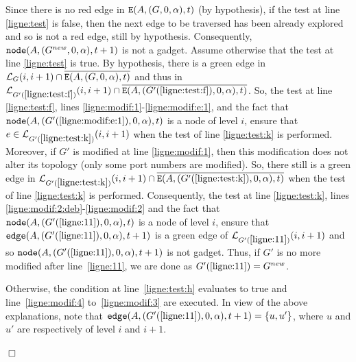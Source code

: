 \documentclass[11pt]{article}
\newcommand{\qed}{\hfill $\Box$ \bigbreak}
\newenvironment{proof}{\noindent {\bf Proof.}}{\qed}
\begin{document}
{\begin{proof}
Since there is no red edge in ${\tt E}(A,(G,0,\alpha),t)$ (by hypothesis), if the test at line
  \ref{ligne:test} is false, then the next edge to be traversed has
  been already explored and so is not a red edge, still by
  hypothesis. Consequently, ${\tt node}(A,(G^{new},0,\alpha),t+1)$ is not a
  gadget.  Assume otherwise that the test at line \ref{ligne:test} is
  true. By hypothesis, there is a green edge in
  $\mathcal{L}_{G}(i,i+1)\cap\overline{{\tt
      E}(A,(G,0,\alpha),t)}$ and thus in $\mathcal{L}_{G'(\ref{ligne:test:f})}(i,i+1)\cap\overline{{\tt
      E}(A,(G'(\ref{ligne:test:f}),0,\alpha),t)}$. So, the test at line \ref{ligne:test:f}, lines \ref{ligne:modif:1}-\ref{ligne:modif:e:1}, and the fact that ${\tt node}(A,(G'(\ref{ligne:modif:e:1}),0,\alpha),t)$ is a node of level $i$, ensure that $e
  \in \mathcal{L}_{G'(\ref{ligne:test:k})}(i,i+1)$ when the test of line \ref{ligne:test:k} is
  performed. Moreover, if $G'$ is modified at line
  \ref{ligne:modif:1}, then this modification does not alter its
  topology (only some port numbers are modified). So, there still is a
  green edge in $\mathcal{L}_{G'(\ref{ligne:test:k})}(i,i+1)\cap\overline{{\tt
      E}(A,(G'(\ref{ligne:test:k}),0,\alpha),t)}$ when the test of line \ref{ligne:test:k}
  is performed. Consequently, the test at line \ref{ligne:test:k},
  lines \ref{ligne:modif:2:deb}-\ref{ligne:modif:2} and the fact that ${\tt node}(A,(G'(\ref{ligne:11}),0,\alpha),t)$ is a node of level $i$, ensure that ${\tt edge}(A,(G'(\ref{ligne:11}),0,\alpha),t+1)$ is a green edge of $\mathcal{L}_{G'(\ref{ligne:11})}(i,i+1)$  and so ${\tt node}(A,(G'(\ref{ligne:11}),0,\alpha),t+1)$ is not gadget. Thus, if $G'$
  is no more modified after line~\ref{ligne:11}, we are done as $G'(\ref{ligne:11})=G^{new}$. 

Otherwise, the condition at line~\ref{ligne:test:h} evaluates to true and line~\ref{ligne:modif:4} to~\ref{ligne:modif:3} are executed. In view of the above explanations, note that ${\tt edge}(A,(G'(\ref{ligne:11}),0,\alpha),t+1)=\{u,u'\}$, where $u$ and $u'$ are respectively of level $i$ and $i+1$.


\end{proof}}
\end{document}
